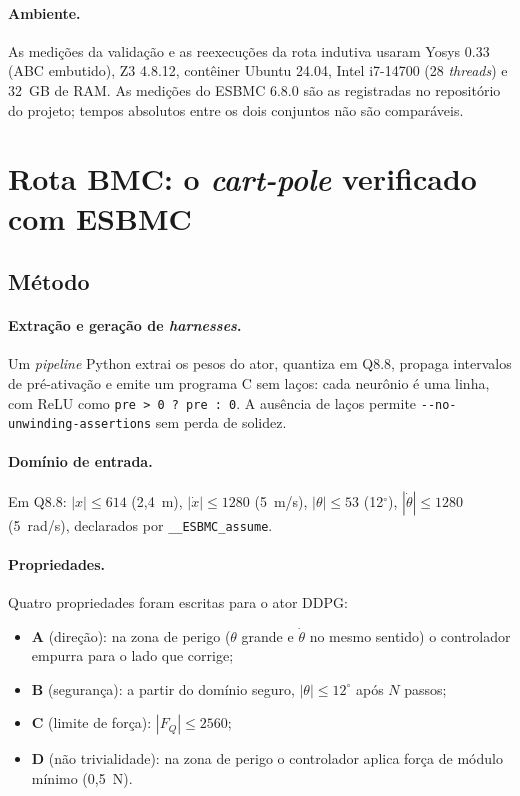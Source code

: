 \documentclass[12pt,openright,oneside,a4paper,chapter=TITLE,sumario=tradicional,english,brazil]{abntex2}
\begin{document}
\paragraph{Ambiente.} As medições da validação e as reexecuções da rota indutiva usaram Yosys 0.33 (ABC embutido), Z3 4.8.12, contêiner Ubuntu 24.04, Intel i7-14700 (28 \emph{threads}) e 32~GB de RAM. As medições do ESBMC 6.8.0 são as registradas no repositório do projeto; tempos absolutos entre os dois conjuntos não são comparáveis.

\section{Rota BMC: o \emph{cart-pole} verificado com ESBMC}\label{cap:esbmc}

\subsection{Método}

\paragraph{Extração e geração de \emph{harnesses}.} Um \emph{pipeline} Python extrai os pesos do ator, quantiza em Q8.8, propaga intervalos de pré-ativação e emite um programa C sem laços: cada neurônio é uma linha, com ReLU como \texttt{pre > 0 ? pre : 0}. A ausência de laços permite \texttt{-{}-no-unwinding-assertions} sem perda de solidez.

\paragraph{Domínio de entrada.} Em Q8.8: $|x|\le614$ (2,4~m), $|\dot x|\le1280$ (5~m/s), $|\theta|\le53$ (12$^\circ$), $|\dot\theta|\le1280$ (5~rad/s), declarados por \texttt{\_\_ESBMC\_assume}.

\paragraph{Propriedades.} Quatro propriedades foram escritas para o ator DDPG:
\begin{itemize}
  \item \textbf{A} (direção): na zona de perigo ($\theta$ grande e $\dot\theta$ no mesmo sentido) o controlador empurra para o lado que corrige;
  \item \textbf{B} (segurança): a partir do domínio seguro, $|\theta|\le12^\circ$ após $N$ passos;
  \item \textbf{C} (limite de força): $|F_Q|\le2560$;
  \item \textbf{D} (não trivialidade): na zona de perigo o controlador aplica força de módulo mínimo (0,5~N).
\end{itemize}
\end{document}
